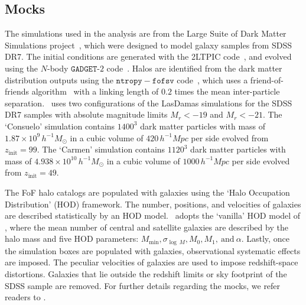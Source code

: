 \documentclass[12pt, letterpaper, preprint]{aastex}
\newcommand{\Sinh}{\citetalias{sinha2017}\xspace}
\begin{document}
\subsection{\cite{sinha2017} Mocks} \label{sec:gmf} 
The simulations used in the \cite{sinha2017} analysis are from the
Large Suite of Dark Matter Simulations project~\citep[LasDamas;][]{mcbride2009}, 
which were designed to model galaxy samples from SDSS DR7. The 
initial conditions are generated with the {\fontshape\scdefault\selectfont 2LTPIC} code~\citep{scoccimarro1998, crocce2006}, 
and evolved using the $N$-body $\mathtt{GADGET}$-$2$ code~\citep{springel2005}.
Halos are identified from the dark matter distribution outputs using 
the $\mathtt{ntropy-fofsv}$ code~\citep{gardner2007}, which uses a 
friend-of-friends algorithm~\citep[FoF;][]{davis1985} with a linking length of $0.2$
times the mean inter-particle separation. %
\Sinh~uses two configurations of the LasDamas simulations for the 
SDSS DR7 samples with absolute magnitude limits $M_r < -19$ and $M_r < -21$.
The `Consuelo' simulation contains $1400^3$ dark matter particles with 
mass of $1.87 \times 10^9\,h^{-1} M_\odot$ in a cubic volume of 
$420\,h^{-1} Mpc$ per side evolved from $z_\mathrm{init} = 99$. 
The `Carmen' simulation contains $1120^3$ dark matter particles with mass 
of $4.938 \times 10^{10}\,h^{-1} M_\odot$ in a cubic volume of 
$1000\,h^{-1} Mpc$ per side evolved from $z_\mathrm{init} = 49$. 

The FoF halo catalogs are populated with galaxies using the 
`Halo Occupation Distribution' (HOD) framework. The 
number, positions, and velocities of galaxies are described statistically 
by an HOD model. \Sinh~adopts the `vanilla' HOD model of \cite{zheng2007}, 
where the mean number of central and satellite galaxies are described by 
the halo mass and five HOD parameters: $M_\mathrm{min}, 
\sigma_{\log\,M} , M_0, M_1,~\mathrm{and}~\alpha$. Lastly, once the 
simulation boxes are populated with galaxies, observational systematic 
effects are imposed. The peculiar velocities of galaxies are used to 
impose redshift-space distortions. Galaxies that lie outside the redshift
limits or sky footprint of the SDSS sample are removed. For further 
details regarding the mocks, we refer readers to \Sinh.
\end{document}
